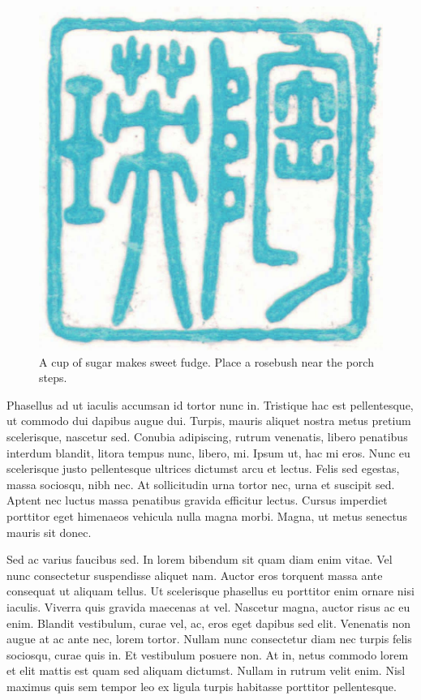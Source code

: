 \documentclass[
  9pt,
  letterpaper,
  DIV=11,
  numbers=noendperiod]{scrartcl}
\begin{document}
\begin{figure}\centering\includegraphics{stamp1b.jpg}\caption{\label{fig-wrap-filter}
A cup of sugar makes sweet fudge. Place a rosebush near the porch
steps.}\end{figure}

Phasellus ad ut iaculis accumsan id tortor nunc in. Tristique hac est
pellentesque, ut commodo dui dapibus augue dui. Turpis, mauris aliquet
nostra metus pretium scelerisque, nascetur sed. Conubia adipiscing,
rutrum venenatis, libero penatibus interdum blandit, litora tempus nunc,
libero, mi. Ipsum ut, hac mi eros. Nunc eu scelerisque justo
pellentesque ultrices dictumst arcu et lectus. Felis sed egestas, massa
sociosqu, nibh nec. At sollicitudin urna tortor nec, urna et suscipit
sed. Aptent nec luctus massa penatibus gravida efficitur lectus. Cursus
imperdiet porttitor eget himenaeos vehicula nulla magna morbi. Magna, ut
metus senectus mauris sit donec.

Sed ac varius faucibus sed. In lorem bibendum sit quam diam enim vitae.
Vel nunc consectetur suspendisse aliquet nam. Auctor eros torquent massa
ante consequat ut aliquam tellus. Ut scelerisque phasellus eu porttitor
enim ornare nisi iaculis. Viverra quis gravida maecenas at vel. Nascetur
magna, auctor risus ac eu enim. Blandit vestibulum, curae vel, ac, eros
eget dapibus sed elit. Venenatis non augue at ac ante nec, lorem tortor.
Nullam nunc consectetur diam nec turpis felis sociosqu, curae quis in.
Et vestibulum posuere non. At in, netus commodo lorem et elit mattis est
quam sed aliquam dictumst. Nullam in rutrum velit enim. Nisl maximus
quis sem tempor leo ex ligula turpis habitasse porttitor pellentesque.
\end{document}

